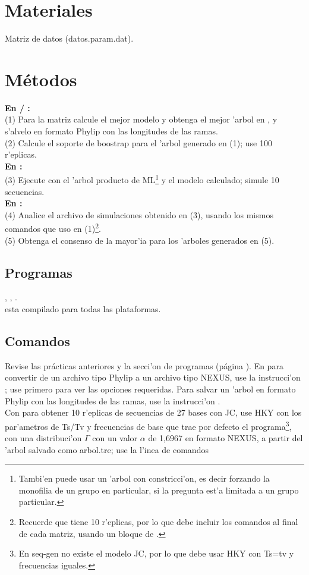 \section{Materiales}
\noindent
Matriz de datos (datos.param.dat).
\section{M\'etodos}
\noindent
\textbf{En  / :}\\
(1) Para la matriz calcule el mejor modelo y obtenga el mejor 'arbol en , y s'alvelo en formato Phylip con las longitudes de las ramas.\\
(2) Calcule el soporte de boostrap para el 'arbol generado en (1); use 100 r'eplicas.\\
\textbf{En :}\\
(3) Ejecute  con el 'arbol producto de ML\footnote{Tambi'en puede usar un 'arbol con constricci'on, es decir forzando la monofilia de un grupo en particular, si la pregunta est'a limitada a un grupo particular.} y el modelo calculado; simule 10 secuencias.\\
\textbf{En :}\\
(4) Analice el archivo de simulaciones obtenido en (3), usando los mismos comandos que uso en (1)\footnote{Recuerde que tiene 10 r'eplicas, por lo que debe incluir los comandos al final de cada matriz, usando un bloque de .}.\\
(5) Obtenga el consenso de la mayor'ia para los 'arboles generados en (5).
\subsection{Programas}
\noindent
{}, , .\\
 esta compilado para todas las plataformas.
\subsection{Comandos}
Revise las pr\'acticas anteriores y la secci'on de programas (p\'agina \pageref{ch:programas}). En  para convertir de un archivo tipo Phylip a un archivo tipo NEXUS, use la instrucci'on ; use primero  para ver las opciones requeridas. Para salvar un 'arbol en formato Phylip con las longitudes de las ramas, use la instrucci'on .\\
Con  para obtener 10 r'eplicas  de secuencias de 27 bases  
con JC, use HKY  con los par'ametros de Ts/Tv y frecuencias de base que trae por defecto el programa\footnote{En seq-gen no existe el modelo JC, por lo que debe usar HKY con Ts=tv y frecuencias iguales.},  con una distribuci'on $\Gamma$ con un valor $\alpha$ de 1,6967  en formato NEXUS, a partir del 'arbol salvado como arbol.tre; use la l'inea de comandos\\

